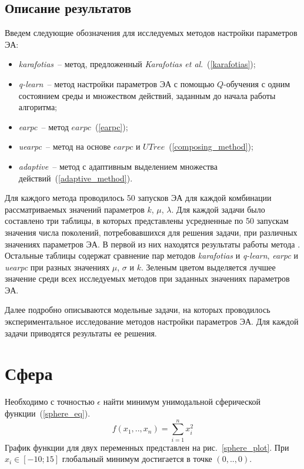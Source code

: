 \subsection{Описание результатов}

Введем следующие обозначения для исследуемых методов настройки параметров ЭА:
\begin{itemize}
 \item \textit{karafotias}~-- метод, предложенный \textit{Karafotias et al}.~(\ref{karafotias});
 \item \textit{q-learn}~-- метод настройки параметров ЭА с помощью $Q$-обучения с одним состоянием среды и множеством действий, заданным до начала работы алгоритма;
 \item \textit{earpc}~-- метод $earpc$~(\ref{earpc});
 \item \textit{uearpc}~-- метод на основе $earpc$ и $UTree$~(\ref{composing_method});
 \item \textit{adaptive}~-- метод с адаптивным выделением множества действий~(\ref{adaptive_method}).
\end{itemize}

Для каждого метода проводилось 50 запусков ЭА для каждой комбинации рассматриваемых значений параметров $k$, $\mu$, $\lambda$. Для каждой задачи было составлено три таблицы, в которых представлены усредненные по 50 запускам значения числа поколений, потребовавшихся для решения задачи, при различных значениях параметров ЭА. В первой из них находятся результаты работы метода . Остальные таблицы содержат сравнение пар методов \textit{karafotias} и \textit{q-learn}, \textit{earpc} и \textit{uearpc} при разных значениях $\mu$, $\sigma$ и $k$. Зеленым цветом выделяется лучшее значение среди всех исследуемых методов при заданных значениях параметров ЭА.
 
Далее подробно описываются модельные задачи, на которых проводилось экспериментальное исследование методов настройки параметров ЭА. Для каждой задачи приводятся результаты ее решения.
 
\section{Сфера}

Необходимо с точностью $\epsilon$ найти минимум унимодальной сферической функции~(\ref{sphere_eq}).
\begin{equation}
\label{sphere_eq}
f(x_1,..,x_n) = \sum\limits_{i=1}^n{x_i^2}
\end{equation}
График функции для двух переменных представлен на рис.~\ref{sphere_plot}. При $x_i \in [-10; 15]$ глобальный минимум достигается в точке $(0,..,0)$.

